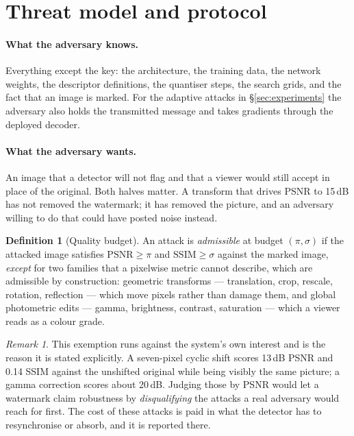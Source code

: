 \documentclass[10pt,twocolumn]{article}
\theoremstyle{definition}
\newtheorem{definition}[theorem]{Definition}
\theoremstyle{remark}
\newtheorem{remark}[theorem]{Remark}
\begin{document}
\section{Threat model and protocol}
\label{sec:threat}

\paragraph{What the adversary knows.} Everything except the key: the
architecture, the training data, the network weights, the descriptor
definitions, the quantiser steps, the search grids, and the fact that an image is
marked. For the adaptive attacks in \S\ref{sec:experiments} the adversary also
holds the transmitted message and takes gradients through the deployed decoder.

\paragraph{What the adversary wants.} An image that a detector will not flag and
that a viewer would still accept in place of the original. Both halves matter. A
transform that drives PSNR to 15\,dB has not removed the watermark; it has
removed the picture, and an adversary willing to do that could have posted noise
instead.

\begin{definition}[Quality budget]
An attack is \emph{admissible} at budget $(\pi,\sigma)$ if the attacked image
satisfies $\mathrm{PSNR}\geq\pi$ and $\mathrm{SSIM}\geq\sigma$ against the marked
image, \emph{except} for two families that a pixelwise metric cannot describe,
which are admissible by construction: geometric transforms --- translation,
crop, rescale, rotation, reflection --- which move pixels rather than damage
them, and global photometric edits --- gamma, brightness, contrast, saturation
--- which a viewer reads as a colour grade.
\end{definition}

\begin{remark}
This exemption runs against the system's own interest and is the reason it is
stated explicitly. A seven-pixel cyclic shift scores 13\,dB PSNR and 0.14 SSIM
against the unshifted original while being visibly the same picture; a gamma
correction scores about 20\,dB. Judging those by PSNR would let a watermark
claim robustness by \emph{disqualifying} the attacks a real adversary would
reach for first. The cost of these attacks is paid in what the detector has to
resynchronise or absorb, and it is reported there.
\end{remark}
\end{document}
